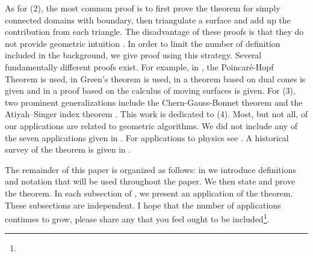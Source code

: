  
As for (2), the most common proof is to first prove the theorem for simply connected domains
with boundary, then triangulate a surface and add up the contribution from each triangle.
The disadvantage of these proofs is that they do not provide geometric intuition \cite{wu_historical_2008}.
In order to limit the number of definition included in the background,
we give proof using this strategy.
Several fundamentally different proofs exist.
For example, in \cite{guillemin_differential_2010}, 
the Poincar\'{e}-Hopf Theorem is used,
in \cite{doc76,pressley_elementary_2010} Green's theorem is used,
in \cite{levi-bicycle} a theorem based on dual cones is given
and in \cite{grinfeld_introduction_2013}
a proof based on the calculus of
moving surfaces is given.
For (3), two prominent generalizations include
the Chern-Gauss-Bonnet theorem \cite{chern_simple_1944} and the Atiyah–Singer index 
theorem \cite{atiyah_index_1963}.
This work is dedicated to (4).
Most, but not all, of our applications are related to geometric algorithms. 
We did not include any of the seven applications given in \cite{doc76}.
For applications to physics see \cite{tirado-physics-apps,gibbons_applications_2008}.
A historical survey of the theorem is given in \cite{wu_historical_2008}.




The remainder of this paper is organized as follows:
in  we introduce definitions and notation that will be used
throughout the paper. We then state and prove the theorem.
In each subsection of , we present an application of the theorem.
These subsections are independent.
I hope that the number of applications continues to grow,
please share any that you feel
ought to be included\footnote{}.

